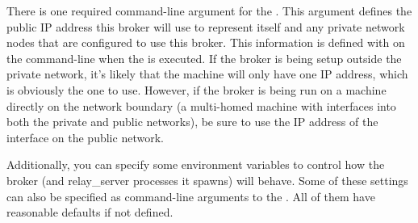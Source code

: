 There is one required command-line argument for the .
This argument defines the public IP address this broker will use to
represent itself and any private network nodes that are configured to
use this broker.
This information is defined with  on the
command-line when the  is executed.
If the broker is being setup outside the private network, it's likely
that the machine will only have one IP address, which is obviously the
one to use.
However, if the broker is being run on a machine directly on the
network boundary (a multi-homed machine with interfaces into both the
private and public networks), be sure to use the IP address of the
interface on the public network.

Additionally, you can specify some environment variables to control
how the broker (and relay\_server processes it spawns) will behave.
Some of these settings can also be specified as command-line
arguments to the .
All of them have reasonable defaults if not defined.


